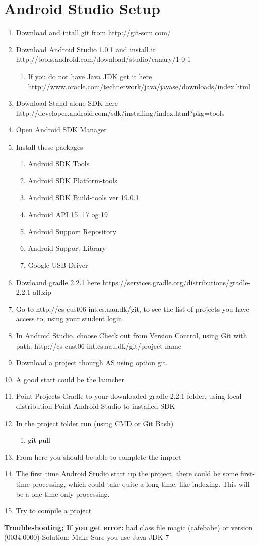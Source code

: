\section{Android Studio Setup}

\begin{enumerate}
	\item Download and intall git from http://git-scm.com/
	\item Download Android Studio 1.0.1 and install it http://tools.android.com/download/studio/canary/1-0-1
	\begin{enumerate}
		\item If you do not have Java JDK get it here http://www.oracle.com/technetwork/java/javase/downloads/index.html
	\end{enumerate}
	\item Download Stand alone SDK here http://developer.android.com/sdk/installing/index.html?pkg=tools
	\item Open Android SDK Manager
	\item Install these packages
	\begin{enumerate}
		\item Android SDK Tools
		\item Android SDK Platform-tools
		\item Android SDK Build-tools ver 19.0.1
		\item Android API 15, 17 og 19
		\item Android Support Repository
		\item Android Support Library
		\item Google USB Driver
	\end{enumerate}
	\item Dowloand gradle 2.2.1 here https://services.gradle.org/distributions/gradle-2.2.1-all.zip
	\item Go to http://cs-cust06-int.cs.aau.dk/git, to see the list of projects you have access to, using your student login
	\item In Android Studio, choose Check out from Version Control, using Git with path: http://cs-cust06-int.cs.aau.dk/git/{project-name}
	\item Download a project thourgh AS using option git.
	\item A good start could be the launcher
	\item Point Projects Gradle to your downloaded gradle 2.2.1 folder, using local distribution Point Android Studio to installed SDK
	\item In the project folder run (using CMD or Git Bash)
	\begin{enumerate}
		\item git pull
	\end{enumerate}
	\item From here you should be able to complete the import
	\item The first time Android Studio start up the project, there could be some first-time processing, which could take quite a long time, like indexing. This will be a one-time only processing.
	\item Try to compile a project
\end{enumerate}

\textbf{Troubleshooting; If you get error:}
bad class file magic (cafebabe) or version (0034.0000)
Solution: Make Sure you use Java JDK 7